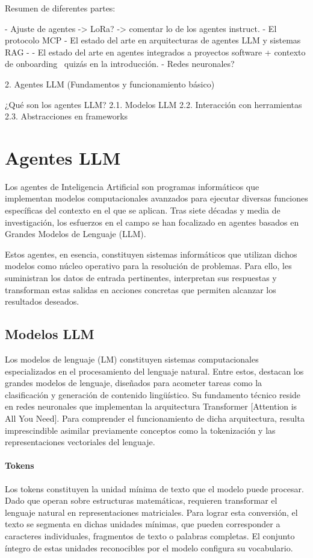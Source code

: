 Resumen de diferentes partes: 

- Ajuste de agentes -> LoRa? -> comentar lo de los agentes instruct.
- El protocolo MCP
- El estado del arte en arquitecturas de agentes LLM y sistemas RAG
- 
- El estado del arte en agentes integrados a proyectos software + contexto de onboarding ~quizás en la introducción.
- Redes neuronales?

2. Agentes LLM (Fundamentos y funcionamiento básico)

¿Qué son los agentes LLM?
2.1. Modelos LLM
2.2. Interacción con herramientas
2.3. Abstracciones en frameworks

\section{Agentes LLM}

Los agentes de Inteligencia Artificial son programas informáticos que implementan modelos computacionales avanzados para ejecutar diversas funciones específicas del contexto en el que se aplican. Tras siete décadas y media de investigación, los esfuerzos en el campo se han focalizado en agentes basados en Grandes Modelos de Lenguaje (LLM). 

Estos agentes, en esencia, constituyen sistemas informáticos que utilizan dichos modelos como núcleo operativo para la resolución de problemas. Para ello, les suministran los datos de entrada pertinentes, interpretan sus respuestas y transforman estas salidas en acciones concretas que permiten alcanzar los resultados deseados.

\subsection{Modelos LLM}

Los modelos de lenguaje (LM) constituyen sistemas computacionales especializados en el procesamiento del lenguaje natural. Entre estos, destacan los grandes modelos de lenguaje, diseñados para acometer tareas  como la clasificación y generación de contenido lingüístico. Su fundamento técnico reside en redes neuronales que implementan la arquitectura Transformer [Attention is All You Need]. Para comprender el funcionamiento de dicha arquitectura, resulta imprescindible asimilar previamente conceptos como la tokenización y las representaciones vectoriales del lenguaje.

\paragraph{Tokens}
Los tokens constituyen la unidad mínima de texto que el modelo puede procesar. Dado que operan sobre estructuras matemáticas, requieren transformar el lenguaje natural en representaciones matriciales. Para lograr esta conversión, el texto se segmenta en dichas unidades mínimas, que pueden corresponder a caracteres individuales, fragmentos de texto o palabras completas. El conjunto íntegro de estas unidades reconocibles por el modelo configura su vocabulario. 

